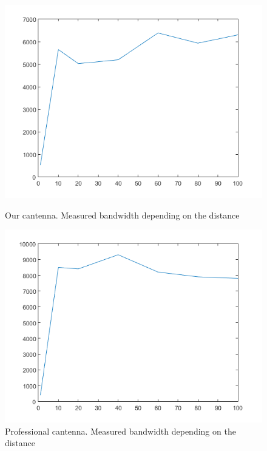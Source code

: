 	\begin{figure}\begin{center}
			\includegraphics[width=\figurewidth]{plots/can_b.png}
			\caption{Our cantenna. Measured bandwidth depending on the distance}
			\label{img:dist:band:can}
			
			\includegraphics[width=\figurewidth]{plots/prof_b.png}
			\caption{Professional cantenna. Measured bandwidth depending on the distance}
			\label{img:dist:band:prof}
			

\end{center}
\end{figure}
